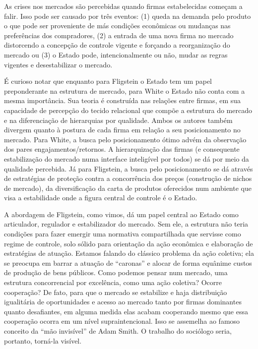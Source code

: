 \documentclass[a4paper, 12pt, openright, oneside, german, french, english, brazil]{abntex2}
\begin{document}
	As crises nos mercados são percebidas quando firmas estabelecidas começam a falir. Isso pode ser causado por três eventos: (1) queda na demanda pelo produto o que pode ser proveniente de más condições econômicas ou mudanças nas preferências dos compradores, (2) a entrada de uma nova firma no mercado distorcendo a concepção de controle vigente e forçando a reorganização do mercado ou (3) o Estado pode, intencionalmente ou não, mudar as regras vigentes e desestabilizar o mercado.

	É curioso notar que enquanto para Fligstein o Estado tem um papel preponderante na estrutura de mercado, para White o Estado não conta com a mesma importância. Sua teoria é construída nas relações entre firmas, em sua capacidade de percepção do tecido relacional que compõe a estrutura do mercado e na diferenciação de hierarquias por qualidade. Ambos os autores também divergem quanto à postura de cada firma em relação a seu posicionamento no mercado. Para White, a busca pelo posicionamento ótimo advém da observação dos pares engajamentos/retornos. A hierarquização das firmas (e consequente estabilização do mercado numa interface inteligível por todos) se dá por meio da qualidade percebida. Já para Fligstein, a busca pelo posicionamento se dá através de estratégias de proteção contra a concorrência dos preços (construção de nichos de mercado), da diversificação da carta de produtos oferecidos num ambiente que visa a estabilidade onde a figura central de controle é o Estado.

	A abordagem de Fligstein, como vimos, dá um papel central ao Estado como articulador, regulador e estabilizador do mercado. Sem ele, a estrutura não teria condições para fazer emergir uma normativa compartilhada que servisse como regime de controle, solo sólido para orientação da ação econômica e elaboração de estratégias de atuação. Estamos falando do clássico problema da ação coletiva; ela se preocupa em barrar a atuação de ``caronas'' e alocar de forma equânime custos de produção de bens públicos. Como podemos pensar num mercado, uma estrutura concorrencial por excelência, como uma ação coletiva? Ocorre cooperação? De fato, para que o mercado se estabilize e haja distribuição igualitária de oportunidades e acesso ao mercado tanto por firmas dominantes quanto desafiantes, em alguma medida  elas acabam cooperando mesmo que essa cooperação ocorra em um nível supraintencional. Isso se assemelha ao famoso conceito da ``mão invisível'' de Adam Smith. O trabalho do sociólogo seria, portanto, torná-la visível.
\end{document}
